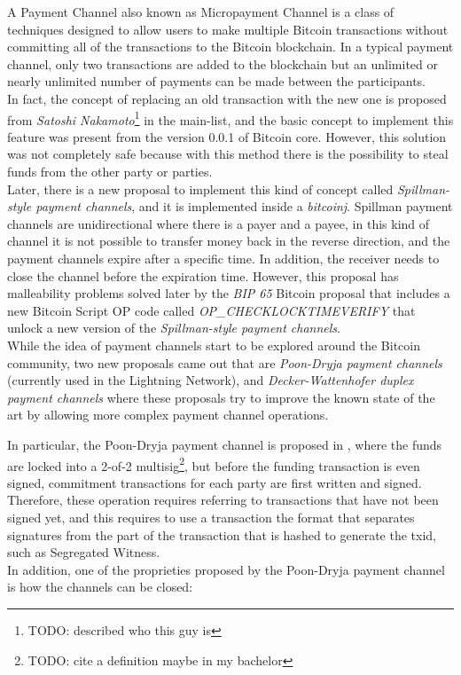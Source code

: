 A Payment Channel also known as Micropayment Channel is a class of techniques designed to allow users to make multiple
Bitcoin transactions without committing all of the transactions to the Bitcoin blockchain. In a typical payment channel,
only two transactions are added to the blockchain but an unlimited or nearly unlimited number of payments
can be made between the participants.\\
In fact, the concept of replacing an old transaction with the new one is proposed from \emph{Satoshi Nakamoto}\footnote{TODO: described who this guy is} in the main-list\cite{payment-channels-satoshi}, and
the basic concept to implement this feature was present from the version 0.0.1 of Bitcoin core. However, this solution
was not completely safe because with this method there is the possibility to steal funds from the other party or parties.\\

Later, there is a new proposal to implement this kind of concept called \emph{Spillman-style payment channels}, and it is
implemented inside a \emph{bitcoinj}\cite{bitcoinj-impl}. Spillman payment channels are unidirectional where
there is a payer and a payee, in this kind of channel it is not possible to transfer money back in the reverse direction, and the payment
channels expire after a specific time.
In addition, the receiver needs to close the channel before the expiration time.
However, this proposal has malleability problems solved later by the \emph{BIP  65}\cite{bip65} Bitcoin proposal that includes a new Bitcoin Script OP code
called \emph{OP\_CHECKLOCKTIMEVERIFY} that unlock a new version of the \emph{Spillman-style payment channels}.\\
While the idea of payment channels start to be explored around the Bitcoin community, two new proposals came out that are
\emph{Poon-Dryja payment channels}\cite{lightning-network-paper} (currently used in the Lightning Network),
and \emph{Decker-Wattenhofer duplex payment channels}\cite{Decker2015fast} where these proposals try to improve the known state
of the art by allowing more complex payment channel operations.

In particular, the Poon-Dryja payment channel is proposed in \cite{lightning-network-paper}, where
the funds are locked into a 2-of-2 multisig\footnote{TODO: cite a definition maybe in my bachelor},
but before the funding transaction is even signed, commitment transactions for each party are first written and signed.
Therefore, these operation requires referring to transactions that have not been signed yet, and this requires to use a transaction
the format that separates signatures from the part of the transaction that is hashed to generate the txid, such as Segregated Witness.\\
In addition, one of the proprieties proposed by the Poon-Dryja payment channel is how the channels can be closed:

